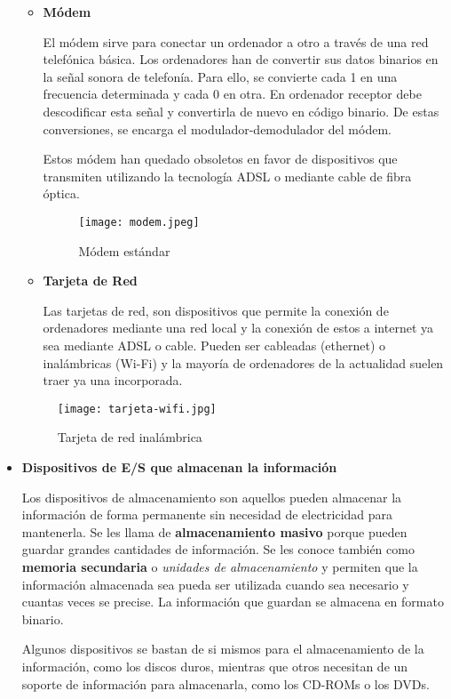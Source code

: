 \begin{itemize}
\begin{itemize}
    \item \textbf{Módem}

    El módem sirve para conectar un ordenador a otro a través de una red telefónica básica. Los ordenadores han de convertir sus datos binarios en la señal sonora de telefonía. Para ello, se convierte cada 1 en una frecuencia determinada y cada 0 en otra. En ordenador receptor debe descodificar esta señal y convertirla de nuevo en código binario. De estas conversiones, se encarga el modulador-demodulador del módem.

    Estos módem han quedado obsoletos en favor de dispositivos que transmiten utilizando la tecnología ADSL o mediante cable de fibra óptica.

    \begin{figure}[ht]
        \centering
        \texttt{[image: modem.jpeg]}
        \caption{Módem estándar}
    \end{figure}

    \item \textbf{Tarjeta de Red}

    Las tarjetas de red, son dispositivos que permite la conexión de ordenadores mediante una red local y la conexión de estos a internet ya sea mediante ADSL o cable. Pueden ser cableadas (ethernet) o inalámbricas (Wi-Fi) y la mayoría de ordenadores de la actualidad suelen traer ya una incorporada.
    \end{itemize}

    \begin{figure}[ht]
        \centering
        \texttt{[image: tarjeta-wifi.jpg]}
        \caption{Tarjeta de red inalámbrica}
    \end{figure}

    \item \textbf{Dispositivos de E/S que almacenan la información}

    Los dispositivos de almacenamiento son aquellos pueden almacenar la información de forma permanente sin necesidad de electricidad para mantenerla. Se les llama de \textbf{almacenamiento masivo} porque pueden guardar grandes cantidades de información. Se les conoce también como \textbf{memoria secundaria} o \textit{unidades de almacenamiento} y permiten que la información almacenada sea pueda ser utilizada cuando sea necesario y cuantas veces se precise. La información que guardan se almacena en formato binario.

    Algunos dispositivos se bastan de si mismos para el almacenamiento de la información, como los discos duros, mientras que otros necesitan de un soporte de información para almacenarla, como los CD-ROMs o los DVDs.


\end{itemize}
